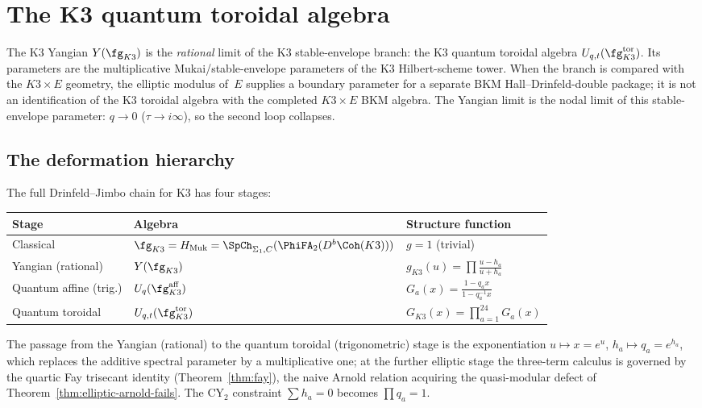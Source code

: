 
\section{The K3 quantum toroidal algebra}
\label{subsec:k3-quantum-toroidal}

The K3 Yangian $Y(\fg_{K3})$ is the \emph{rational} limit of the K3
stable-envelope branch: the K3 quantum toroidal algebra
$U_{q,t}(\fg_{K3}^{\mathrm{tor}})$. Its parameters are the
multiplicative Mukai/stable-envelope parameters of the K3 Hilbert-scheme
tower. When the branch is compared with the $K3 \times E$ geometry, the
elliptic modulus of~$E$ supplies a boundary parameter for a separate
BKM Hall--Drinfeld-double package; it is not an identification of the
K3 toroidal algebra with the completed $K3 \times E$ BKM algebra. The
Yangian limit is the nodal limit of this stable-envelope parameter:
$q \to 0$ ($\tau \to i\infty$), so the second loop collapses.

\subsection{The deformation hierarchy}

The full Drinfeld--Jimbo chain for K3 has four stages:
\begin{center}
\small
\renewcommand{\arraystretch}{1.3}
\begin{tabular}{lll}
\toprule
\textbf{Stage} & \textbf{Algebra} & \textbf{Structure function} \\
\midrule
Classical & $\fg_{K3} = H_{\mathrm{Muk}} = \SpCh_{\Sigma_1, C}(\PhiFA_2(D^b\Coh(K3)))$ & $g = 1$ (trivial) \\
Yangian (rational) & $Y(\fg_{K3})$ & $g_{K3}(u) = \prod \frac{u - h_a}{u + h_a}$ \\
Quantum affine (trig.) & $U_q(\fg_{K3}^{\mathrm{aff}})$ & $G_a(x) = \frac{1 - q_a x}{1 - q_a^{-1} x}$ \\
Quantum toroidal & $U_{q,t}(\fg_{K3}^{\mathrm{tor}})$ & $G_{K3}(x) = \prod_{a=1}^{24} G_a(x)$ \\
\bottomrule
\end{tabular}
\end{center}
The passage from the Yangian (rational) to the quantum toroidal
(trigonometric) stage is the exponentiation
$u \mapsto x = e^u$, $h_a \mapsto q_a = e^{h_a}$,
which replaces the additive spectral parameter by a multiplicative
one; at the further elliptic stage the three-term calculus is
governed by the quartic Fay trisecant identity
(Theorem~\ref{thm:fay}), the naive Arnold relation acquiring the
quasi-modular defect of Theorem~\ref{thm:elliptic-arnold-fails}. The
CY$_2$ constraint $\sum h_a = 0$ becomes $\prod q_a = 1$.

